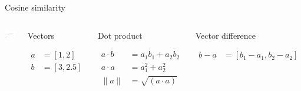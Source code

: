\documentclass[
  10pt,
  ignorenonframetext,
  x11names, dvipsnames, bibspacing,natbib, table]{beamer}
\begin{document}
\begin{frame}{Cosine similarity}
\protect\hypertarget{cosine-similarity-2}{}
\begin{columns}
    

\begin{center}\includegraphics[width=1.15\linewidth]{presentationBoston_files/figure-beamer/cosine3-1} \end{center}




\footnotesize 


\begin{block}{Vectors}

\begin{align*}
a  & = [1,2]\\
b  &= [3,2.5]
\end{align*}

\end{block}


\begin{block}{Dot product}

\begin{align*}
a \cdot b & = a_1 b_1 + a_2 b_2\\
a \cdot a & = a_1^2 + a_2 ^ 2 \\
\lVert a\rVert & = \sqrt{(a \cdot a)}
\end{align*}

\end{block}


\begin{block}{Vector difference}

\begin{align*}
b - a & = [b_1- a_1, b_2 - a_2 ]
\end{align*}

\end{block}

\end{columns}
\end{frame}
\end{document}
